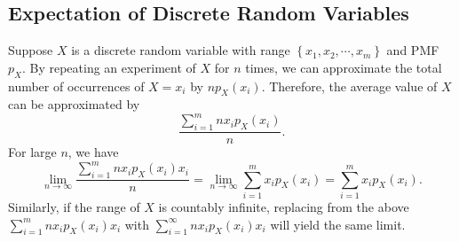 \documentclass[math]{amznotes}
\theoremstyle{remark}
\begin{document}
\subsection{Expectation of Discrete Random Variables}
Suppose $X$ is a discrete random variable with range $\left\{x_1, x_2, \cdots, x_m\right\}$ and PMF $p_X$. By repeating an experiment of $X$ for $n$ times, we can approximate the total number of occurrences of $X = x_i$ by $np_X(x_i)$. Therefore, the average value of $X$ can be approximated by
\begin{equation*}
    \frac{\sum_{i = 1}^{m}nx_ip_X(x_i)}{n}.
\end{equation*}
For large $n$, we have
\begin{equation*}
    \lim_{n \to \infty}\frac{\sum_{i = 1}^{m}nx_ip_X(x_i)x_i}{n} = \lim_{n \to \infty}\sum_{i = 1}^{m}x_ip_X(x_i) = \sum_{i = 1}^{m}x_ip_X(x_i).
\end{equation*}
Similarly, if the range of $X$ is countably infinite, replacing from the above $\sum_{i = 1}^{m}nx_ip_X(x_i)x_i$ with $\sum_{i = 1}^{\infty}nx_ip_X(x_i)x_i$ will yield the same limit.
\end{document}
